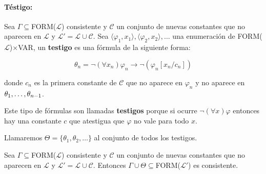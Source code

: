 \paragraph{Téstigo:} Sea $\Gamma\subseteq$FORM($\mathcal{L}$) consistente y  $\mathcal{C}$ un conjunto de nuevas constantes que no aparecen en $\mathcal{L}$ y $\mathcal{L}' = \mathcal{L}\cup\mathcal{C}$. Sea $\langle\varphi_1,x_1\rangle,\langle\varphi_2,x_2\rangle,\dots$ una enumeración de FORM($\mathcal{L}$)$\times$VAR, un \textbf{testigo} es una fórmula de la siguiente forma:

$$\theta_n = \lnot(\forall x_n)\varphi_n\to\lnot(\varphi_n[x_n/c_n])$$

donde $c_n$ es la primera constante de $\mathcal{C}$ que no aparece en $\varphi_n$ y no aparece en $\theta_1,\dots, \theta_{ n-1}$. 

Este tipo de fórmulas son llamadas \textbf{testigos} porque si ocurre $\lnot(\forall x)\varphi$ entonces hay una constante $c$ que atestigua que $\varphi$ no vale para todo $x$. 

Llamaremos $\Theta = \{\theta_1,\theta_2,\dots\}$ al conjunto de  todos los testigos.

\begin{teorema}
	Sea $\Gamma\subseteq$FORM($\mathcal{L}$) consistente y  $\mathcal{C}$ un conjunto de nuevas constantes que no aparecen en $\mathcal{L}$ y $\mathcal{L}' = \mathcal{L}\cup\mathcal{C}$. Entonces $\Gamma\cup\Theta\subseteq$FORM($\mathcal{L}'$) es consistente.
\end{teorema}


